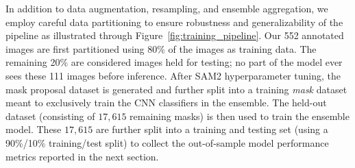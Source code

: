 \documentclass[11pt]{elsarticle}
\begin{document}
\begin{table}[htbp]
\centering
\caption{CNN Classifier Architecture and Training Hyperparameters}
\label{tab:cnn-architecture}
\end{table}

In addition to data augmentation, resampling, and ensemble aggregation, we employ careful data partitioning to ensure robustness and generalizability of the pipeline as illustrated through Figure~\ref{fig:training_pipeline}. Our 552 annotated images are first partitioned using 80\% of the images as training data. The remaining 20\% are considered images held for testing; no part of the model ever sees these 111 images before inference. After SAM2 hyperparameter tuning, the mask proposal dataset is generated and further split into a training \emph{mask} dataset meant to exclusively train the CNN classifiers in the ensemble. The held-out dataset (consisting of $17,615$ remaining masks) is then used to train the ensemble model. These $17,615$ are further split into a training and testing set (using a 90\%/10\% training/test split) to collect the out-of-sample model performance metrics reported in the next section.
\end{document}
